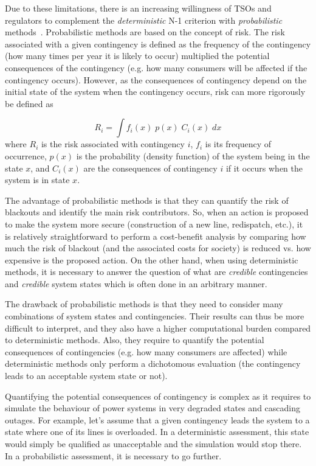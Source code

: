 Due to these limitations, there is an increasing willingness of TSOs and regulators to complement the \emph{deterministic} N-1 criterion with \emph{probabilistic} methods~\cite{ACER}. Probabilistic methods are based on the concept of risk. The risk associated with a given contingency is defined as the frequency of the contingency (how many times per year it is likely to occur) multiplied the potential consequences of the contingency (e.g. how many consumers will be affected if the contingency occurs). However, as the consequences of contingency depend on the initial state of the system when the contingency occurs, risk can more rigorously be defined as

\begin{equation}
    \label{eq:risk}
    {R_i = \int f_i(x) \; p(x) \; C_i(x) \; dx}
\end{equation}
\noindent where \(R_i\) is the risk associated with contingency \(i\), \(f_i\) is its frequency of occurrence, \(p(x)\) is the probability (density function) of the system being in the state \(x\), and \(C_i(x)\) are the consequences of contingency \(i\) if it occurs when the system is in state \(x\).

The advantage of probabilistic methods is that they can quantify the risk of blackouts and identify the main risk contributors. So, when an action is proposed to make the system more secure (construction of a new line, redispatch, etc.), it is relatively straightforward to perform a cost-benefit analysis by comparing how much the risk of blackout (and the associated costs for society) is reduced vs. how expensive is the proposed action. On the other hand, when using deterministic methods, it is necessary to answer the question of what are \emph{credible} contingencies and \emph{credible} system states which is often done in an arbitrary manner.

The drawback of probabilistic methods is that they need to consider many combinations of system states and contingencies. Their results can thus be more difficult to interpret, and they also have a higher computational burden compared to deterministic methods. Also, they require to quantify the potential consequences of contingencies (e.g. how many consumers are affected) while deterministic methods only perform a dichotomous evaluation (the contingency leads to an acceptable system state or not).

Quantifying the potential consequences of contingency is complex as it requires to simulate the behaviour of power systems in very degraded states and cascading outages. For example, let's assume that a given contingency leads the system to a state where one of its lines is overloaded. In a deterministic assessment, this state would simply be qualified as unacceptable and the simulation would stop there. In a probabilistic assessment, it is necessary to go further.

